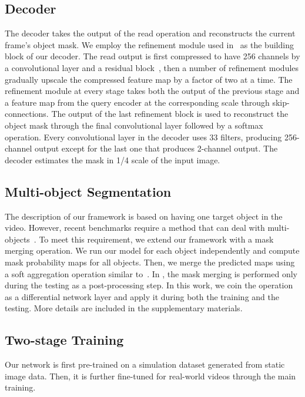 \documentclass[10pt,twocolumn,letterpaper]{article}
\begin{document}
\subsection{Decoder}
The decoder takes the output of the read operation and reconstructs the current frame's object mask. 
We employ the refinement module used in~\cite{oh2018fast} as the building block of our decoder. 
The read output is first compressed to have 256 channels by a convolutional layer and a residual block~\cite{he2016identity}, then a number of refinement modules gradually upscale the compressed feature map by a factor of two at a time. 
The refinement module at every stage takes both the output of the previous stage and a feature map from the query encoder at the corresponding scale through skip-connections.
The output of the last refinement block is used to reconstruct the object mask through the final convolutional layer followed by a softmax operation. Every convolutional layer in the decoder uses 33 filters, producing 256-channel output except for the last one that produces 2-channel output. The decoder estimates the mask in 1/4 scale of the input image.

\subsection{Multi-object Segmentation}
The description of our framework is based on having one target object in the video. 
However, recent benchmarks require a method that can deal with multi-objects~\cite{Pont-Tuset_arXiv_2017, xu2018youtube}. 
To meet this requirement, we extend our framework with a mask merging operation. 
We run our model for each object independently and compute mask probability maps for all objects.
Then, we merge the predicted maps using a soft aggregation operation similar to~\cite{oh2018fast}.
In \cite{oh2018fast}, the mask merging is performed only during the testing as a post-processing step.
In this work, we coin the operation as a differential network layer and apply it during both the training and the testing.
More details are included in the supplementary materials.







\subsection{Two-stage Training}\label{Sect:training}
Our network is first pre-trained on a simulation dataset generated from static image data. 
Then, it is further fine-tuned for real-world videos through the main training. 
\end{document}
